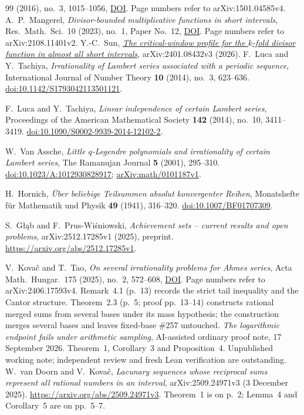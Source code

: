 \begin{thebibliography}{99}
  (2016), no.~3, 1015--1056,
  \href{https://doi.org/10.4007/annals.2016.183.3.6}{DOI}.  Page numbers
  refer to arXiv:1501.04585v4.
 A.~P.~Mangerel, \emph{Divisor-bounded multiplicative
  functions in short intervals}, Res.\ Math.\ Sci.\ 10 (2023), no.~1, Paper
  No.~12, \href{https://doi.org/10.1007/s40687-023-00376-0}{DOI}.  Page numbers
  refer to arXiv:2108.11401v2.
 Y.-C.~Sun,
  \href{https://arxiv.org/abs/2401.08432v3}{\emph{The critical-window profile
  for the $k$-fold divisor function in almost all short intervals}},
  arXiv:2401.08432v3 (2026).
F.~Luca and Y.~Tachiya,
\emph{Irrationality of Lambert series associated with a periodic sequence},
International Journal of Number Theory \textbf{10} (2014), no.~3, 623--636.
\href{https://doi.org/10.1142/S1793042113501121}{doi:10.1142/S1793042113501121}.

F.~Luca and Y.~Tachiya,
\emph{Linear independence of certain Lambert series},
Proceedings of the American Mathematical Society \textbf{142} (2014), no.~10, 3411--3419.
\href{https://doi.org/10.1090/S0002-9939-2014-12102-2}{doi:10.1090/S0002-9939-2014-12102-2}.

W.~Van Assche,
\emph{Little $q$-Legendre polynomials and irrationality of certain Lambert series},
The Ramanujan Journal \textbf{5} (2001), 295--310.
\href{https://doi.org/10.1023/A:1012930828917}{doi:10.1023/A:1012930828917};
\href{https://arxiv.org/abs/math/0101187v1}{arXiv:math/0101187v1}.

H.~Hornich,
\emph{\"Uber beliebige Teilsummen absolut konvergenter Reihen},
Monatshefte f\"ur Mathematik und Physik \textbf{49} (1941), 316--320.
\href{https://doi.org/10.1007/BF01707309}{doi:10.1007/BF01707309}.

S.~G\l\k{a}b and F.~Prus-Wi\'sniowski,
\emph{Achievement sets -- current results and open problems},
arXiv:2512.17285v1 (2025), preprint.
\url{https://arxiv.org/abs/2512.17285v1}.

 V.~Kova\v{c} and T.~Tao, \emph{On several irrationality
  problems for Ahmes series}, Acta Math.\ Hungar.\ 175 (2025), no.~2, 572--608,
  \href{https://doi.org/10.1007/s10474-025-01528-0}{DOI}.  Page numbers refer
  to arXiv:2406.17593v4.  Remark~4.1 (p.~13) records the strict tail
  inequality and the Cantor structure.  Theorem~2.3 (p.~5; proof pp.~13--14)
  constructs rational merged sums from several bases under its mass
  hypothesis; the construction merges several bases and leaves fixed-base \#257 untouched.
 \emph{The logarithmic endpoint fails under arithmetic
  sampling}, AI-assisted ordinary proof note, 17 September 2026.
  Theorem~1, Corollary~3 and Proposition~4.  Unpublished working note;
  independent review and fresh Lean verification are outstanding.
 W.~van Doorn and V.~Kova\v{c},
  \emph{Lacunary sequences whose reciprocal sums represent all rational
  numbers in an interval}, arXiv:2509.24971v3 (3 December 2025).
  \url{https://arxiv.org/abs/2509.24971v3}.
  Theorem~1 is on p.~2; Lemma~4 and Corollary~5 are on pp.~5--7.

\end{thebibliography}


